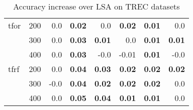 \begin{table}[H]
\begin{center}
\begin{tabular}{ll|rrrrrr}
tfor & 200 &       0.0 &  \textbf{0.02} &       0.0 &  \textbf{0.02} &  \textbf{0.01} &       0.0 \\
   & 300 &       0.0 &  \textbf{0.03} &  \textbf{0.01} &       0.0 &  \textbf{0.01} &  \textbf{0.01} \\
   & 400 &       0.0 &  \textbf{0.03} &       -0.0 &      -0.01 &  \textbf{0.01} &      -0.0 \\
tfrf & 200 &       0.0 &  \textbf{0.04} &  \textbf{0.03} &  \textbf{0.02} &  \textbf{0.02} &  \textbf{0.02} \\
   & 300 &       -0.0 &  \textbf{0.04} &  \textbf{0.02} &  \textbf{0.02} &  \textbf{0.02} &       0.0 \\
   & 400 &       0.0 &  \textbf{0.05} &  \textbf{0.04} &  \textbf{0.01} &  \textbf{0.01} &       0.0 \\
\bottomrule
\end{tabular}

\caption[Accuracy increase over LSA on TREC datasets]{Accuracy increase over LSA on TREC datasets}
\label{tab:batch:results:trec}
\end{center}
\end{table}

